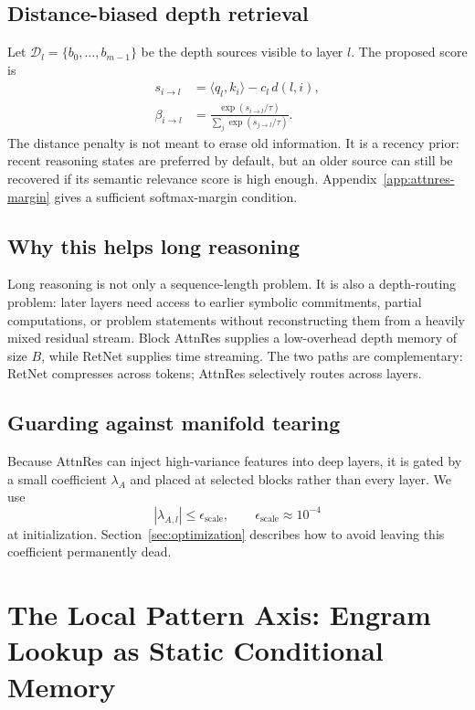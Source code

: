 \documentclass[11pt]{article}
\begin{document}
\subsection{Distance-biased depth retrieval}

Let $\mathcal{D}_l=\{b_0,\ldots,b_{m-1}\}$ be the depth sources visible to layer $l$. The proposed score is
\begin{align}
\label{eq:attnres-score}
s_{i\to l} &= \langle q_l, k_i\rangle - c_l\,d(l,i), \\
\beta_{i\to l} &= \frac{\exp(s_{i\to l}/\tau)}{\sum_{j}\exp(s_{j\to l}/\tau)}.
\end{align}
The distance penalty is not meant to erase old information. It is a recency prior: recent reasoning states are preferred by default, but an older source can still be recovered if its semantic relevance score is high enough. Appendix~\ref{app:attnres-margin} gives a sufficient softmax-margin condition.

\subsection{Why this helps long reasoning}

Long reasoning is not only a sequence-length problem. It is also a depth-routing problem: later layers need access to earlier symbolic commitments, partial computations, or problem statements without reconstructing them from a heavily mixed residual stream. Block AttnRes supplies a low-overhead depth memory of size $B$, while RetNet supplies time streaming. The two paths are complementary: RetNet compresses across tokens; AttnRes selectively routes across layers.

\subsection{Guarding against manifold tearing}

Because AttnRes can inject high-variance features into deep layers, it is gated by a small coefficient $\lambda_A$ and placed at selected blocks rather than every layer. We use
\begin{equation}
|\lambda_{A,l}|\leq \epsilon_{\mathrm{scale}},\qquad \epsilon_{\mathrm{scale}}\approx 10^{-4}
\end{equation}
at initialization. Section~\ref{sec:optimization} describes how to avoid leaving this coefficient permanently dead.

\section{The Local Pattern Axis: Engram Lookup as Static Conditional Memory}
\end{document}
